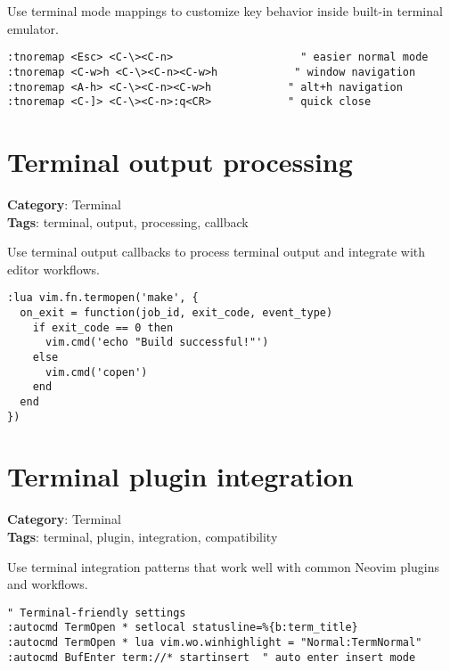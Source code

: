 {{{{{{{{{{Use terminal mode mappings to customize key behavior inside built-in terminal emulator.

\begin{Exa*}{}
\begin{Verbatim}[fontsize=\footnotesize, breaklines, breakanywhere]
:tnoremap <Esc> <C-\><C-n>                    " easier normal mode
:tnoremap <C-w>h <C-\><C-n><C-w>h            " window navigation
:tnoremap <A-h> <C-\><C-n><C-w>h            " alt+h navigation
:tnoremap <C-]> <C-\><C-n>:q<CR>            " quick close
\end{Verbatim}
\end{Exa*}

\section{Terminal output processing}

\textbf{Category}: Terminal\\ \textbf{Tags}: terminal, output, processing, callback
\vspace{0.5cm}

Use terminal output callbacks to process terminal output and integrate with editor workflows.

\begin{Exa*}{}
\begin{Verbatim}[fontsize=\footnotesize, breaklines, breakanywhere]
:lua vim.fn.termopen('make', {
  on_exit = function(job_id, exit_code, event_type)
    if exit_code == 0 then 
      vim.cmd('echo "Build successful!"')
    else
      vim.cmd('copen')
    end
  end
})
\end{Verbatim}
\end{Exa*}

\section{Terminal plugin integration}

\textbf{Category}: Terminal\\ \textbf{Tags}: terminal, plugin, integration, compatibility
\vspace{0.5cm}

Use terminal integration patterns that work well with common Neovim plugins and workflows.

\begin{Exa*}{}
\begin{Verbatim}[fontsize=\footnotesize, breaklines, breakanywhere]
" Terminal-friendly settings
:autocmd TermOpen * setlocal statusline=%{b:term_title}
:autocmd TermOpen * lua vim.wo.winhighlight = "Normal:TermNormal"
:autocmd BufEnter term://* startinsert  " auto enter insert mode
\end{Verbatim}
\end{Exa*}

}}}}}}}}}}
